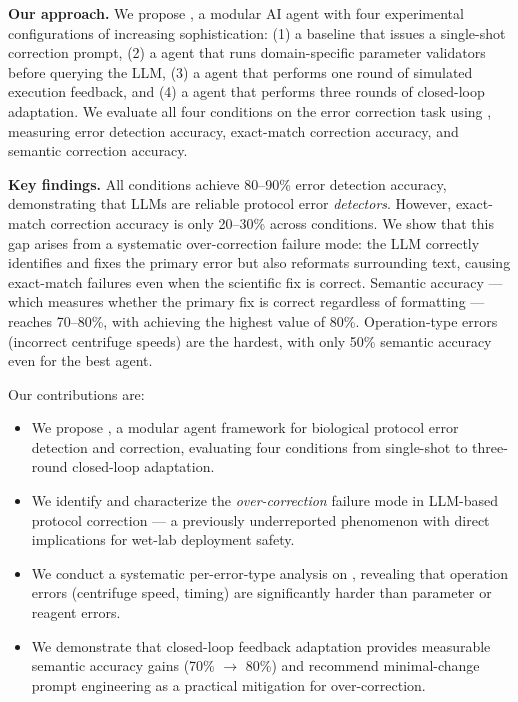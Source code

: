 {\bf Our approach.}
We propose \wetlabagent, a modular AI agent with four experimental configurations of increasing sophistication:
(1) a \vanilla baseline that issues a single-shot correction prompt,
(2) a \toolaug agent that runs domain-specific parameter validators before querying the LLM,
(3) a \feedbackone agent that performs one round of simulated execution feedback, and
(4) a \feedbackthree agent that performs three rounds of closed-loop adaptation.
We evaluate all four conditions on the \bioprobench error correction task using \claude, measuring error detection accuracy, exact-match correction accuracy, and semantic correction accuracy.

{\bf Key findings.}
All conditions achieve 80--90\% error detection accuracy, demonstrating that LLMs are reliable protocol error \emph{detectors}.
However, exact-match correction accuracy is only 20--30\% across conditions.
We show that this gap arises from a systematic over-correction failure mode: the LLM correctly identifies and fixes the primary error but also reformats surrounding text, causing exact-match failures even when the scientific fix is correct.
Semantic accuracy --- which measures whether the primary fix is correct regardless of formatting --- reaches 70--80\%, with \feedbackthree achieving the highest value of 80\%.
Operation-type errors (\eg incorrect centrifuge speeds) are the hardest, with only 50\% semantic accuracy even for the best agent.

Our contributions are:
\begin{itemize}[leftmargin=*,itemsep=0pt,topsep=0pt]
    \item We propose \wetlabagent, a modular agent framework for biological protocol error detection and correction, evaluating four conditions from single-shot to three-round closed-loop adaptation.
    \item We identify and characterize the \emph{over-correction} failure mode in LLM-based protocol correction --- a previously underreported phenomenon with direct implications for wet-lab deployment safety.
    \item We conduct a systematic per-error-type analysis on \bioprobench, revealing that operation errors (centrifuge speed, timing) are significantly harder than parameter or reagent errors.
    \item We demonstrate that closed-loop feedback adaptation provides measurable semantic accuracy gains (70\% $\to$ 80\%) and recommend minimal-change prompt engineering as a practical mitigation for over-correction.
\end{itemize}
